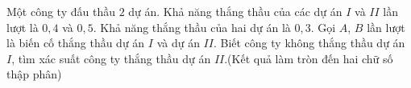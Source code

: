 \begin{bt}%

	Một công ty đấu thầu $2$ dự án. Khả năng thắng thầu của các dự án $I$ và $II$ lần lượt là $0{,}4$ và $0{,}5$. Khả năng thắng thầu của hai dự án là $0{,}3$. Gọi $A$, $B$ lần lượt là biến cố thắng thầu dự án $I$ và dự án $II$. Biết công ty không thắng thầu dự án $I$, tìm xác suất công ty thắng thầu dự án $II$.(Kết quả làm tròn đến hai chữ số thập phân)
\end{bt}

